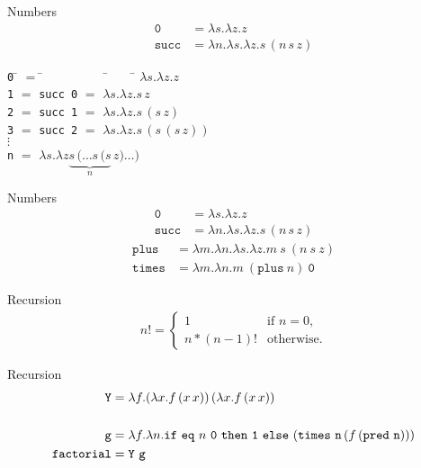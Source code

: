 \documentclass{beamer}
\newcommand{\mkw}[1]{{\bf \mathtt{#1}}}
\newcommand{\sym}[1]{\texttt{#1}}
\newcommand{\msym}[1]{\mathtt{#1}}
\newcommand{\centeredtab}[1]{\begin{center}\parbox{0cm}{\begin{tabbing}#1\end{tabbing}}\end{center}}
\begin{document}
\begin{frame}{Numbers}
\begin{align*}
\msym{0}    &= \lambda s.\lambda z.z \\
\msym{succ} &= \lambda n.\lambda s.\lambda z.s\,(n\,s\,z)
\end{align*}
\centeredtab{
\sym{0} \= $=$ \= ~~~~~~~~~    \= ~~~ \= $\lambda s.\lambda z.z$    \\
\sym{1} \> $=$ \> \sym{succ 0} \> $=$ \> $\lambda s.\lambda z.s\,z$ \\
\sym{2} \> $=$ \> \sym{succ 1} \> $=$ \> $\lambda s.\lambda z.s\,(s\,z)$ \\
\sym{3} \> $=$ \> \sym{succ 2} \> $=$ \> $\lambda s.\lambda z.s\,(s\,(s\,z))$ \\
$\vdots$ \\
\sym{n} \> $=$ \> \> \> $\lambda s.\lambda z\underbrace{s\,(\dots s\,(s}_n\,z)\dots)$
}
\end{frame}
\begin{frame}{Numbers}
\begin{align*}
\msym{0}    &= \lambda s.\lambda z.z \\
\msym{succ} &= \lambda n.\lambda s.\lambda z.s\,(n\,s\,z)
\end{align*}
\begin{align*}
\msym{plus}  &= \lambda m.\lambda n.\lambda s. \lambda z.m\ s\ (n\ s\ z) \\
\msym{times} &= \lambda m.\lambda n.m\ (\msym{plus}\ n)\ \msym{0}
\end{align*}
\end{frame}
\begin{frame}{Recursion}
\begin{align*}
n!=\begin{cases}
    1 & \text{if $n=0$},\\
    n*(n-1)! & \text{otherwise}.
  \end{cases}
\end{align*}
\end{frame}
\begin{frame}{Recursion}
\begin{align*}
\msym{Y} &= \lambda f.(\lambda x.f\,(x\,x))\,(\lambda x.f\,(x\,x)) \\\\
\msym{g} &= \lambda f.\lambda
n.\mkw{if}\ \msym{eq}\ n\ \msym{0}\ \mkw{then}\ \msym{1}\ \mkw{else}\ (\msym{times}\ \msym{n}\,(f\,(\msym{pred}\ \msym{n}))) \\
\msym{factorial} &= \msym{Y}\ \msym{g}
\end{align*}
\end{frame}
\end{document}
